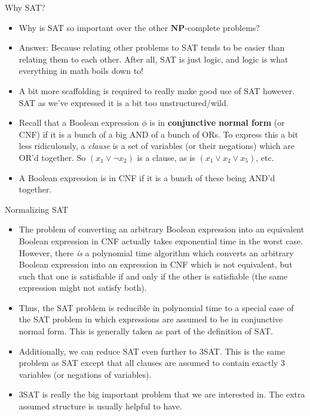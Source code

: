 \documentclass{beamer}
\begin{document}
\begin{frame}{Why SAT?}
    \begin{itemize}
        \item Why is SAT so important over the other $\mathbf{NP}$-complete problems?
        \item Answer: Because relating other problems to SAT tends to be easier than relating them to each other. After all, SAT is just logic, and logic is what everything in math boils down to!
        \item A bit more scaffolding is required to really make good use of SAT however. SAT as we've expressed it is a bit too unstructured/wild. 
        \item Recall that a Boolean expression $\phi$ is in \textbf{conjunctive normal form} (or CNF) if it is a bunch of a big AND of a bunch of ORs. To express this a bit less ridiculously, a \emph{clause} is a set of variables (or their negations) which are OR'd together. So $(x_1 \vee \neg x_2)$ is a clause, as is $(x_1 \vee x_2 \vee x_5)$, etc.
        \item A Boolean expression is in CNF if it is a bunch of these being AND'd together. \pause  
    \end{itemize}
\end{frame}

\begin{frame}{Normalizing SAT}
    \begin{itemize}
        \item The problem of converting an arbitrary Boolean expression into an equivalent Boolean expression in CNF actually takes exponential time in the worst case. However, there \emph{is} a polynomial time algorithm which converts an arbitrary Boolean expression into an expression in CNF which is not equivalent, but such that one is satisfiable if and only if the other is satisfiable (the same expression might not satisfy both). \pause
        \item Thus, the SAT problem is reducible in polynomial time to a special case of the SAT problem in which expressions are assumed to be in conjunctive normal form. This is generally taken as part of the definition of SAT. \pause 
        \item Additionally, we can reduce SAT even further to 3SAT. This is the same problem as SAT except that all clauses are assumed to contain exactly 3 variables (or negations of variables). \pause 
        \item 3SAT is really the big important problem that we are interested in. The extra assumed structure is usually helpful to have.
    \end{itemize}
\end{frame}
\end{document}
